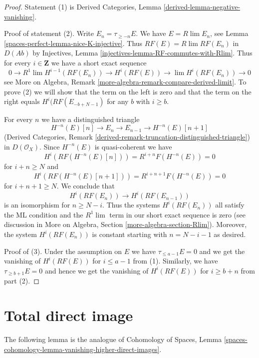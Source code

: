 \begin{proof}
Statement (1) is
Derived Categories, Lemma \ref{derived-lemma-negative-vanishing}.

\medskip\noindent
Proof of statement (2). Write $E_n = \tau_{\geq -n}E$. We have
$E = R\lim E_n$, see Lemma \ref{spaces-perfect-lemma-nice-K-injective}. Thus
$RF(E) = R\lim RF(E_n)$ in $D(\textit{Ab})$ by Injectives, Lemma
\ref{injectives-lemma-RF-commutes-with-Rlim}. Thus for every $i \in \mathbf{Z}$
we have a short exact sequence
$$
0 \to R^1\lim H^{i - 1}(RF(E_n)) \to H^i(RF(E)) \to \lim H^i(RF(E_n)) \to 0
$$
see More on Algebra, Remark
\ref{more-algebra-remark-compare-derived-limit}.
To prove (2) we will show that the term on the left is zero
and that the term on the right equals $H^i(RF(E_{-b + N - 1})$
for any $b$ with $i \geq b$.

\medskip\noindent
For every $n$ we have a distinguished triangle
$$
H^{-n}(E)[n] \to E_n \to E_{n - 1} \to H^{-n}(E)[n + 1]
$$
(Derived Categories, Remark
\ref{derived-remark-truncation-distinguished-triangle})
in $D(\mathcal{O}_X)$. Since $H^{-n}(E)$ is quasi-coherent we have
$$
H^i(RF(H^{-n}(E)[n])) = R^{i + n}F(H^{-n}(E)) = 0
$$
for $i + n \geq N$ and
$$
H^i(RF(H^{-n}(E)[n + 1])) = R^{i + n + 1}F(H^{-n}(E)) = 0
$$
for $i + n + 1 \geq N$. We conclude that
$$
H^i(RF(E_n)) \to H^i(RF(E_{n - 1}))
$$
is an isomorphism for $n \geq N - i$. Thus the systems $H^i(RF(E_n))$ all
satisfy the ML condition and the $R^1\lim$ term in our short exact
sequence is zero (see discussion in
More on Algebra, Section \ref{more-algebra-section-Rlim}).
Moreover, the system $H^i(RF(E_n))$ is constant starting
with $n = N - i - 1$ as desired.

\medskip\noindent
Proof of (3). Under the assumption on $E$ we have
$\tau_{\leq a - 1}E = 0$ and we get the vanishing
of $H^i(RF(E))$ for $i \leq a - 1$ from (1).
Similarly, we have $\tau_{\geq b + 1}E = 0$ and hence
we get the vanishing of $H^i(RF(E))$ for $i \geq b + n$ from
part (2).
\end{proof}

\section{Total direct image}
\label{spaces-perfect-section-total-direct-image}
The following lemma is the analogue of
Cohomology of Spaces, Lemma
\ref{spaces-cohomology-lemma-vanishing-higher-direct-images}.

